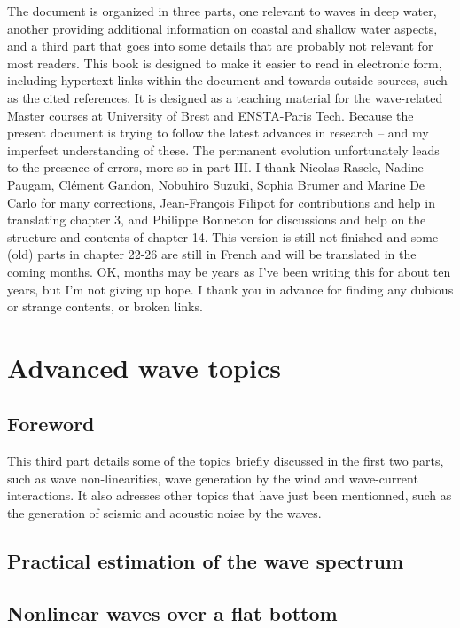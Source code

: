 \documentclass[a4paper]{book}  %
\begin{document}
\vspace{0.5cm}
The document is organized in three parts, one relevant to waves in deep water, another providing additional 
information on coastal and shallow water aspects, and a third part that goes into some details that are probably not relevant for 
most readers. This book is designed to make it easier to read in electronic form, including hypertext links within the document 
and towards outside sources, such as the cited references. It is designed as a teaching material for the wave-related Master courses 
at University of Brest and ENSTA-Paris Tech. Because the present document is trying to follow the latest 
advances in research -- and my imperfect understanding of these. The permanent evolution unfortunately leads to the presence of errors, more so in part III. 
I thank 
Nicolas Rascle, Nadine Paugam, Clément Gandon, Nobuhiro Suzuki, Sophia Brumer and Marine De Carlo  for many corrections, Jean-Fran{\c c}ois Filipot for contributions and help in translating chapter 3, and 
Philippe Bonneton for discussions and help on the structure and contents of chapter 14.  
This version is still not finished and some (old) parts in chapter 22-26 are still in French and will be translated in the coming months. OK, months may be years as I've been writing this for about ten years, but I'm not giving up hope.
I thank you in advance for finding any dubious or strange contents, or broken links.



\part{Advanced wave topics}
\chapter*{Foreword}\label{foreword2}
This third part details some of the topics briefly discussed in the first two parts, 
such as wave non-linearities, wave generation by the wind
and wave-current interactions. It also adresses other topics that have just been mentionned, such as the generation of 
seismic and acoustic noise by the waves.  
\cleardoublepage
\chapter{Practical estimation of the wave spectrum}\label{ch_anaspec}

\cleardoublepage
\chapter{Nonlinear waves over a flat bottom}\label{ch_nonlin}
 
\cleardoublepage
\end{document}
